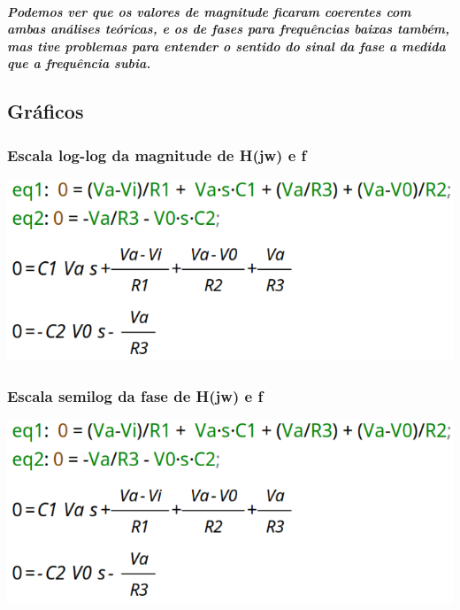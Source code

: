 \documentclass[12pt,twoside, a4paper, twocolumn]{article}
\begin{document}
\subparagraph*{Podemos ver que os valores de magnitude ficaram coerentes com ambas análises teóricas, e os de fases para frequências baixas também, mas tive problemas para entender o sentido do sinal da fase a medida que a frequência subia.}




\subsection{Gráficos}




\subsubsection{Escala log-log da magnitude de H(jw) e f}




\begin{adjustbox}{scale=0.70}
    \includegraphics{eqs.png}
\end{adjustbox}




\subsubsection{Escala semilog da fase de H(jw) e f}
\begin{adjustbox}{scale=0.70}
    \includegraphics{eqs.png}
\end{adjustbox}
\end{document}
